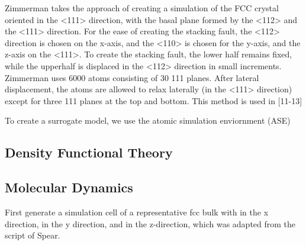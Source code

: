 Zimmerman takes the approach of creating a simulation of the FCC crystal oriented in the <111> direction, with the basal plane formed by the <112> and the <111> direction.  For the ease of creating the stacking fault, the <112> direction is chosen on the x-axis, and the <110> is chosen for the y-axis, and the z-axis on the <111>.  To create the stacking fault, the lower half remains fixed, while the upperhalf is displaced in the <112> direction in small increments.  Zimmerman uses 6000 atoms consisting of 30 {111} planes.  After lateral displacement, the atoms are allowed to relax laterally (in the <111> direction) except for three {111} planes at the top and bottom.  This method is used in [11-13]

To create a surrogate model, we use the atomic simulation enviornment (ASE)

\subsection{Density Functional Theory}



\subsection{Molecular Dynamics}

First generate a simulation cell of a representative fcc bulk with \hkl[1 1 2] in the x direction, \hkl[-1 1 0] in the y direction, and \hkl[-1 -1 1] in the z-direction, which was adapted from the script of Spear\cite{spear2012_lammps_gsf}.

